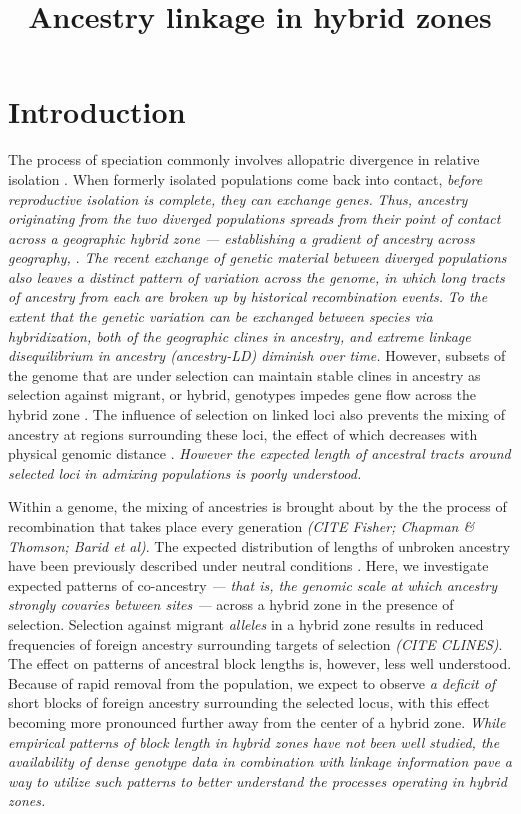 \documentclass[12pt]{article}
\title{Ancestry linkage in hybrid zones}
\author{}
\date{} %
\newcommand{\alisa}[1]{{\em \color{red} #1}}
\newcommand{\yb}[1]{{\em \color{magenta} #1}}
\begin{document}
\maketitle


\section{Introduction}
The process of speciation commonly involves allopatric divergence in relative isolation \citep{Coyne2004}.  
When formerly isolated populations come back into contact, \yb{before reproductive isolation is complete, they can exchange genes.}  
\yb{Thus, ancestry originating from the two diverged populations spreads from their point of contact across a geographic hybrid zone --- establishing a gradient of ancestry across geography, \citep{Barton1985}}. 
\yb{The recent exchange of genetic material between diverged populations also leaves a distinct pattern of variation across the genome, in which long tracts of ancestry from each  are broken up by historical recombination events.}  
\yb{To the extent that the genetic variation can be exchanged between species via hybridization, both of the geographic clines in ancestry, and extreme linkage disequilibrium in ancestry (ancestry-LD) diminish over time.} 
However, subsets of the genome that are under selection can maintain stable clines in ancestry as selection against migrant, or hybrid, genotypes impedes gene flow across the hybrid zone \citep{Barton1979a}. 
The influence of selection on linked loci also prevents the mixing of ancestry at regions surrounding these loci, the effect of which decreases with physical genomic distance \citep{Barton1986}. 
\yb{However the expected length of ancestral tracts around selected loci in admixing populations is poorly understood.}


Within a genome, the mixing of ancestries is brought about by the the process of recombination that takes place every generation \yb{(CITE Fisher; Chapman \& Thomson; Barid et al)}.   
The expected distribution of lengths of unbroken ancestry have been previously described under neutral conditions \cite[e.g.][]{Gravel2012,Sedghifar2015}.  
Here, we investigate expected patterns of co-ancestry \yb{ --- that is, the genomic scale at which ancestry strongly covaries between sites --- } across a hybrid zone in the presence of selection. 
Selection against migrant \yb{alleles} in a hybrid zone results in reduced frequencies of foreign ancestry surrounding targets of selection \yb{(CITE CLINES)}. 
The effect on patterns of ancestral block lengths is, however, less well understood. 
Because of rapid removal from the population, we expect to observe \yb{a deficit of} short blocks of foreign ancestry surrounding the selected locus, with this effect becoming more pronounced further away from the center of a hybrid zone. 
\alisa{While empirical patterns of block length in hybrid zones have not been well studied, the availability of dense genotype data in combination with linkage information pave a way to utilize such patterns to better understand the processes operating in hybrid zones. } %
\end{document}
